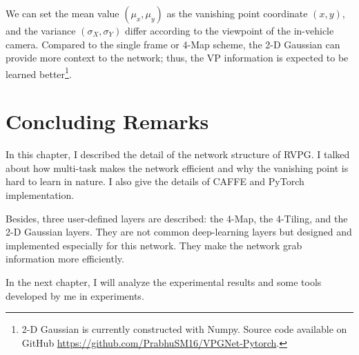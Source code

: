 \begin{spacing}{1.5}
We can set the mean value $(\mu_x,\mu_y)$ as the vanishing point coordinate $(x,y)$, and the variance $(\sigma_X,\sigma_Y)$ differ according to the viewpoint of the in-vehicle camera. Compared to the single frame or 4-Map scheme, the 2-D Gaussian can provide more context to the network; thus, the VP information is expected to be learned better\footnote{2-D Gaussian is currently constructed with Numpy. Source code available on GitHub \url{https://github.com/PrabhuSM16/VPGNet-Pytorch}.}.

\section{Concluding Remarks}

In this chapter, I described the detail of the network structure of RVPG. I talked about how multi-task makes the network efficient and why the vanishing point is hard to learn in nature. I also give the details of CAFFE and PyTorch implementation.

Besides, three user-defined layers are described: the 4-Map, the 4-Tiling, and the 2-D Gaussian layers. They are not common deep-learning layers but designed and implemented especially for this network. They make the network grab information more efficiently.

In the next chapter, I will analyze the experimental results and some tools developed by me in experiments.

\end{spacing}
\newpage

